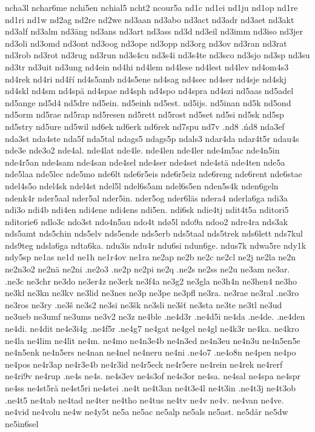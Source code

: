 {{ncha3l
nchar6me
nchi5en
nchial5
ncht2
ncour5a
nd1c
nd1ei
nd1ju
nd1op
nd1re
nd1ri
nd1w
nd2ag
nd2re
nd2we
nd3aan
nd3abo
nd3act
nd3adr
nd3aet
nd3akt
nd3alf
nd3alm
nd3äng
nd3ans
nd3art
nd3ass
nd3d
nd3eil
nd3imm
nd3iso
nd3jer
nd3oli
nd3omd
nd3ont
nd3oog
nd3ope
nd3opp
nd3org
nd3ov
nd3ran
nd3rat
nd3rob
nd3rot
nd3rug
nd3run
nd3s4cu
nd3s4i
nd3s4te
nd3sco
nd3sjo
nd3sp
nd3su
nd3tr
nd3uit
nd3ung
nd4ein
nd4hi
nd4lem
nd4lese
nd4lest
nd4lev
nd4om4s3
nd4rek
nd4ri
nd4ří
nd4s5amb
nd4s5ene
nd4sag
nd4sec
nd4ser
nd4sje
nd4skj
nd4skl
nd4sm
nd4spä
nd4spae
nd4sph
nd4spo
nd4spra
nd4szi
nd5aas
nd5adel
nd5ange
nd5d4
nd5dre
nd5ein.
nd5einh
nd5est.
nd5ijs.
nd5inan
nd5k
nd5ond
nd5orm
nd5rae
nd5rap
nd5resen
nd5rett
nd5rost
nd5set
nd5si
nd5sk
nd5sp
nd5stry
nd5ure
nd5wil
nd6ek
nd6erk
nd6rek
nd7spu
nd7v
.nd8
.ńd8
nda3ef
nda3st
nda4ste
nda5f
nda5tal
ndags5
ndags5p
ndals3
ndar4da
ndar4t5r
ndau4s
nde3e
nde3o2
nde4al.
nde4lat
nde4le.
nde4len
nde4ler
nde4m5ac
nde4n5in
nde4r5an
nde4sam
nde4san
nde4sel
nde4ser
nde4set
nde4stä
nde4ten
nde5a
nde5laa
nde5lec
nde5mo
nde6lt
nde6r5eis
nde6r5eiz
nde6reng
nde6rent
nde6stae
ndel4s5o
ndel4sk
ndel4st
ndel5l
ndel6s5am
ndel6s5en
nden5s4k
nden6geln
ndenk4r
nder5aal
nder5al
nder5in.
nder5og
nder6läs
ndera4
nderla6ga
ndi3a
ndi3o
ndi4b
ndi4en
ndi4ene
ndi4ens
ndi5en.
ndi6sk
ndie4tj
ndit4t5a
nditori5
nditorie6
ndlo3c
ndo3st
ndo4n5au
ndo4t
ndø5l
ndo9a
ndoo2
ndre4ra
nds3ak
nds5amt
nds5chin
nds5elv
nds5ende
nds5erb
nds5taal
nds5trek
nds6lett
nds7kul
nds9teg
ndsla6ga
ndta6ka.
ndu3is
ndu4r
ndu6si
ndun6ge.
ndus7k
ndwa5re
ndy1k
ndy5sp
ne1as
ne1d
ne1h
ne1r4ov
ne1ra
ne2ap
ne2b
ne2c
ne2cl
ne2j
ne2la
ne2n
ne2n3o2
ne2nä
ne2ni
.ne2o3
.ne2p
ne2pi
ne2q
.ne2s
ne2ss
ne2u
ne3am
ne3ar.
.ne3c
ne3chr
ne3do
ne3er4z
ne3erk
ne3f4a
ne3g2
ne3gla
ne3h4n
ne3hen4
ne3ho
ne3kl
ne3kn
ne3kv
ne3lid
ne3nes
ne3p
ne3pe
ne3pfl
ne3ra.
ne3rae
ne3ral
.ne3ro
ne3ros
ne3ry
.ne3š
ne3s2
ne3si
ne3šk
ne3sli
ne3šť
ne3sta
ne3te
ne3tl
ne3ud
ne3ueb
ne3umf
ne3ums
ne3v2
ne3z
ne4ble
.ne4d3r
.ne4d5i
ne4da
.ne4de.
.ne4den
ne4di.
ne4dit
ne4e3i4g
.ne4f5r
.ne4g7
ne4gat
ne4gel
ne4gl
ne4k3r
ne4ka.
ne4kro
ne4la
ne4lim
ne4lit
ne4m.
ne4mo
ne4n3e4b
ne4n3ed
ne4n3eu
ne4n3u
ne4n5en5e
ne4n5enk
ne4n5ers
ne4nan
ne4nel
ne4neru
ne4ni
.ne4o7
.ne4o8n
ne4pen
ne4po
ne4pos
ne4r3ap
ne4r3e4b
ne4r3id
ne4r5eck
ne4r5ere
ne4rein
ne4rek
ne4rerf
ne4ri9v
ne4rup
.ne4s
ne4s.
ne4s3ev
ne4s3of
ne4s3or
ne4sa.
ne4sal
ne4spa
ne4spr
ne4ss
ne4st5rä
ne4st5ri
ne4stei
.ne4t
ne4t3an
ne4t3e4l
ne4t3in
.ne4t3j
ne4t3ob
.ne4t5
ne4tab
ne4tad
ne4ter
ne4tho
ne4tus
ne4tv
ne4v
ne4v.
ne4van
ne4ve.
ne4vid
ne4volu
ne4w
ne4y5t
ne5a
ne5ac
ne5alp
ne5als
ne5ast.
ne5dår
ne5dw
ne5in6sel
}}
